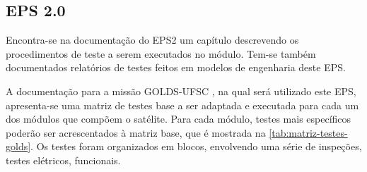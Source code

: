 \subsection{EPS 2.0}

Encontra-se na documentação do \gls{EPS2} \cite{eps2-doc} um capítulo descrevendo os procedimentos de teste a serem executados no módulo.
Tem-se também documentados relatórios de testes feitos em modelos de engenharia deste \gls{EPS}.

A documentação para a missão GOLDS-UFSC \cite{golds-ufsc-doc}, na qual será utilizado este \gls{EPS}, apresenta-se uma matriz de testes base a ser adaptada e executada para cada um dos módulos que compõem o satélite.
Para cada módulo, testes mais específicos poderão ser acrescentados à matriz base, que é mostrada na \autoref{tab:matriz-testes-golds}.
Os testes foram organizados em blocos, envolvendo uma série de inspeções, testes elétricos, funcionais.

